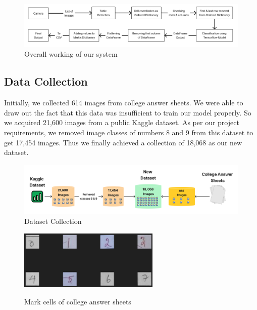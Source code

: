 \vspace{2 cm}

\begin{figure}[htbp]
  \centering
  \includegraphics[width=1\textwidth]{Images/Dataset/Overall_Working_Of_System.jpg}
  \caption{Overall working of our system}
\end{figure}

\clearpage

\subsection{Data Collection}

\noindent Initially, we collected 614 images from college answer sheets. We were able to draw out the fact that this data was insufficient to train our model properly. So we acquired 21,600 images from a public Kaggle dataset. As per our project requirements, we removed image classes of numbers 8 and 9 from this dataset to get 17,454 images. Thus we finally achieved a collection of 18,068 as our new dataset.

\begin{figure}[h!]
    \centering
    \includegraphics[width=\textwidth]
    {Images/Dataset/Dataset_Counts.png}
    \caption{Dataset Collection}
\end{figure}

\begin{figure}[h!]
    \centering
{\includegraphics[width=0.6\textwidth]{Images/Dataset/Clg_ans_sheet.png}}
  \caption{Mark cells of college answer sheets}
\end{figure} 

